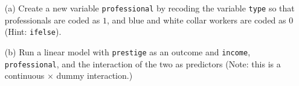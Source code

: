 \documentclass[12pt,letterpaper]{article}
\begin{document}
\newpage
\begin{enumerate}
	
	\item [(a)]
	Create a new variable \texttt{professional} by recoding the variable \texttt{type} so that professionals are coded as $1$, and blue and white collar workers are coded as $0$ (Hint: \texttt{ifelse}).
		
	\vspace{6cm}
	
	
	\item [(b)]
	Run a linear model with \texttt{prestige} as an outcome and \texttt{income}, \texttt{professional}, and the interaction of the two as predictors (Note: this is a continuous $\times$ dummy interaction.)
		
	

\end{enumerate}
\end{document}
